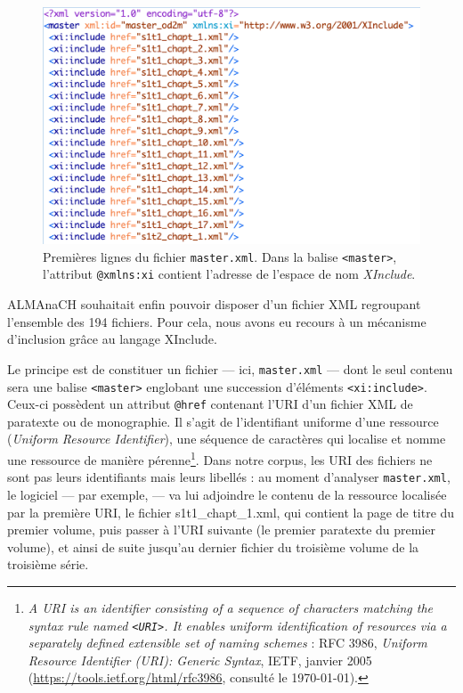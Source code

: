 \begin{figure}
    \centering
    \includegraphics[width=15cm]{img/xinclude.png}
    \caption{Premières lignes du fichier \texttt{master.xml}. Dans la balise \texttt{<master>}, l'attribut \texttt{@xmlns:xi} contient l'adresse de l'espace de nom \textit{XInclude}.}
    \label{fig:xinclude}
\end{figure}

ALMAnaCH souhaitait enfin pouvoir disposer d'un fichier XML regroupant l'ensemble des 194 fichiers. Pour cela, nous avons eu recours à un mécanisme d'inclusion grâce au langage XInclude.

Le principe est de constituer un fichier --- ici, \texttt{master.xml} --- dont le seul contenu sera une balise \texttt{<master>} englobant une succession d'éléments \texttt{<xi:include>}. Ceux-ci possèdent un attribut \texttt{@href} contenant l'URI d'un fichier XML de paratexte ou de monographie. Il s'agit de l'identifiant uniforme d'une ressource (\textit{Uniform Resource Identifier}), \cad{} une séquence de caractères qui localise et nomme une ressource de manière pérenne\footnote{\og \textit{A URI is an identifier consisting of a sequence of characters matching the syntax rule named \texttt{<URI>}. It enables uniform identification of resources via a separately defined extensible set of naming schemes} \fg{} : RFC 3986, \textit{Uniform Resource Identifier (URI): Generic Syntax}, IETF, janvier 2005 (\url{https://tools.ietf.org/html/rfc3986}, consulté le \today).}. Dans notre corpus, les URI des fichiers ne sont pas leurs identifiants mais leurs libellés : au moment d'analyser \texttt{master.xml}, le logiciel --- par exemple, \oxygen{} --- va lui adjoindre le contenu de la ressource localisée par la première URI, \cad{} le fichier s1t1\_chapt\_1.xml, qui contient la page de titre du premier volume, puis passer à l'URI suivante (le premier paratexte du premier volume), et ainsi de suite jusqu'au dernier fichier du troisième volume de la troisième série.

